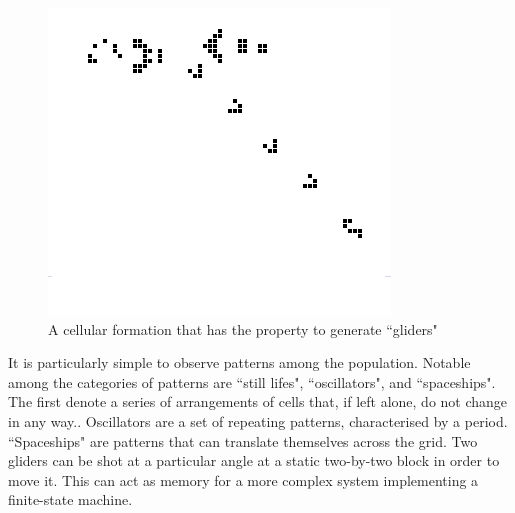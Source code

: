 \begin{figure}[!th]
	\centering
	\includegraphics[scale=0.6]{images/glidergun}
	\caption{A cellular formation that has the property to generate ``gliders"}
\end{figure}

It is particularly simple to observe patterns among the population. Notable among the categories of patterns are ``still lifes", ``oscillators", and ``spaceships". The first denote a series of arrangements of cells that, if left alone, do not change in any way.\cite{griffeath2003new}. Oscillators are a set of repeating patterns, characterised by a period. ``Spaceships" are patterns that can translate themselves across the grid. Two gliders can be shot at a particular angle at a static two-by-two block in order to move it. This can act as memory for a more complex system implementing a finite-state machine.